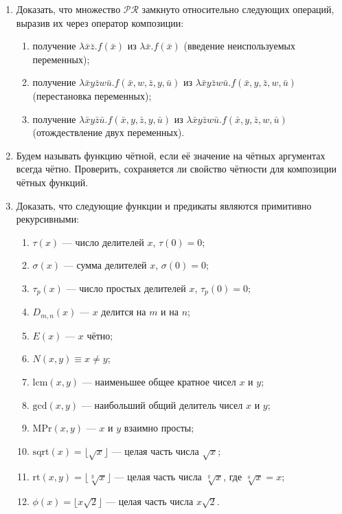 \documentclass[12pt,a4paper]{article}
\begin{document}
\begin{enumerate}[itemsep=3pt]
\item Доказать, что множество $\mathcal{PR}$ замкнуто относительно следующих операций, 
выразив их через оператор композиции:
  \begin{enumerate}
  \item получение $\lambda \bar x \bar z.f(\bar x)$ из $\lambda \bar x.f(\bar x)$ (введение неиспользуемых переменных);
  \item получение $\lambda \bar x y \bar z w \bar u.f(\bar x,w,\bar z,y,\bar u)$ из 
$\lambda \bar x y \bar z w \bar u.f(\bar x,y,\bar z,w,\bar u)$ (перестановка переменных);
\item получение $\lambda \bar x y \bar z \bar u.f(\bar x,y,\bar z,y,\bar u)$ из 
$\lambda \bar x y \bar z w \bar u.f(\bar x,y,\bar z,w,\bar u)$ (отождествление двух переменных).
  \end{enumerate}


\item Будем называть функцию чётной, если её значение на чётных аргументах всегда чётно. 
Проверить, сохраняется ли свойство чётности для композиции чётных функций.
  
\item Доказать, что следующие функции и предикаты являются примитивно рекурсивными:
  \begin{enumerate}
  \item $\tau(x)$ — число делителей $x$, $\tau(0)=0$;
  \item $\sigma(x)$ — сумма делителей $x$, $\sigma(0)=0$;
  \item $\tau_p(x)$ — число простых делителей $x$, $\tau_p(0)=0$;
  \item $D_{m,n}(x)$ — $x$ делится на $m$ и на $n$;
  \item $E(x)$ --- $x$ чётно;
  \item $N(x,y)\equiv x\neq y$;
  \item $\mathrm{lcm}(x,y)$ --- наименьшее общее кратное чисел $x$ и $y$;
  \item $\mathrm{gcd}(x,y)$ --- наибольший общий делитель чисел $x$ и $y$;
  \item $\mathrm{MPr}(x,y)$ --- $x$ и $y$ взаимно просты;
  \item $\mathrm{sqrt}(x) = \lfloor\sqrt x\rfloor$ --- целая часть числа $\sqrt x$;
  \item $\mathrm{rt}(x, y) = \lfloor\sqrt[y] x\rfloor$ --- целая часть числа $\sqrt[y] x$,
где $\sqrt[0]x=x$;
  \item $\phi(x) = \lfloor x\sqrt 2\rfloor$ --- целая часть числа $x \sqrt 2$.
  \end{enumerate}



\end{enumerate}
\end{document}
